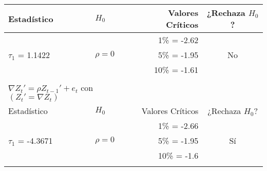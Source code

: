 \begin{table}[ht]
\begin{tabular}{llrc}
	\cline{1-2}
		Estadístico    			& $H_0$ 							& Valores Críticos 	& ¿Rechaza $H_0$? \\
		\hline
							&								& 1\%   = -2.62		&			\\
		 $\tau_1$ = 1.1422		& $\rho=0$			     			& 5\%   = -1.95		&       No		\\
							&  								& 10\% = -1.61		&       		\\
	\firsthline
							&								&				&			\\
	\multicolumn{2}{l}{$\nabla Z_t' = \rho Z_{t-1}' + e_t$ con $(Z_t'=\nabla Z_t)$} \\
	\cline{1-2}
		Estadístico    			& $H_0$ 							& Valores Críticos 	& ¿Rechaza $H_0$? \\
		\hline
	\cline{1-4}				
							&								& 1\%   = -2.66		&			\\
		 $\tau_1$ = -4.3671		& $\rho=0$						& 5\%   = -1.95		&       Sí		\\
							&  								& 10\% = -1.6		&       		\\
	
							
	\lasthline
	\end{tabular}
\label{table:ISALUD}
\end{table}






